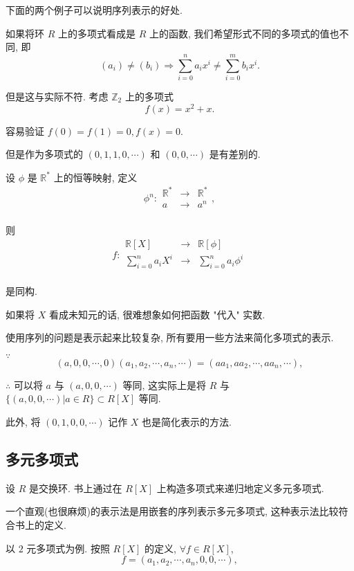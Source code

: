 \documentclass[UTF8]{ctexart}
\begin{document}
下面的两个例子可以说明序列表示的好处.
\begin{example}
    如果将环 $R$ 上的多项式看成是 $R$ 上的函数, 我们希望形式不同的多项式的值也不同, 即
    \[(a_i)\neq(b_i)\Rightarrow\sum\limits_{i=0}^{n}a_ix^i\neq\sum\limits_{i=0}^{m}b_ix^i.\]

    但是这与实际不符. 考虑 $\mathbb{Z}_2$ 上的多项式
    \[f(x)=x^2+x.\]

    容易验证 $f(0)=f(1)=0,f(x)=0$.

    但是作为多项式的 $(0,1,1,0,\cdots)$ 和 $(0,0,\cdots)$ 是有差别的.
\end{example}
\begin{example}
    设 $\phi$ 是 $\mathbb{R}^*$ 上的恒等映射, 定义
    \[\phi^n:\begin{array}{rcl}
        \mathbb{R}^* & \to & \mathbb{R}^* \\
        a & \to & a^n \\
    \end{array},\]

    则
    \[f:\begin{array}{rcl}
        \mathbb{R}[X] & \to & \mathbb{R}[\phi] \\
        \sum\limits_{i=0}^{n}a_iX^i & \to & \sum\limits_{i=0}^{n}a_i\phi^i \\
    \end{array}\]

    是同构.

    如果将 $X$ 看成未知元的话, 很难想象如何把函数 "代入" 实数.
\end{example}
使用序列的问题是表示起来比较复杂, 所有要用一些方法来简化多项式的表示.
\begin{example}
    $\because$
    \[(a,0,0,\cdots,0)(a_1,a_2,\cdots,a_n,\cdots)=(aa_1,aa_2,\cdots,aa_n,\cdots),\]

    $\therefore$ 可以将 $a$ 与 $(a,0,0,\cdots)$ 等同, 这实际上是将 $R$ 与 $\{(a,0,0,\cdots)|a\in R\}\subset R[X]$ 等同.
\end{example}
此外, 将 $(0,1,0,0,\cdots)$ 记作 $X$ 也是简化表示的方法.
\subsection{多元多项式}
设 $R$ 是交换环. 书上通过在 $R[X]$ 上构造多项式来递归地定义多元多项式.

一个直观(也很麻烦)的表示法是用嵌套的序列表示多元多项式, 这种表示法比较符合书上的定义.

以 $2$ 元多项式为例. 按照 $R[X]$ 的定义, $\forall f\in R[X]$,
\[f=(a_1,a_2,\cdots,a_n,0,0,\cdots),\]
\end{document}
